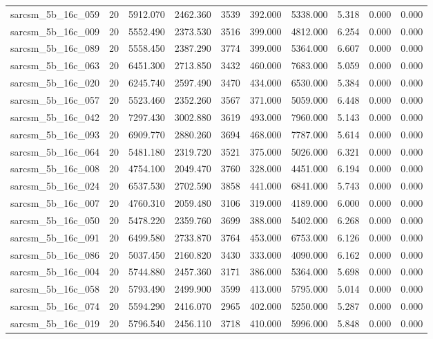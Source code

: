 \begin{tabular}{lrrrrrrrrr}
sarcsm\_5b\_16c\_059 & 20 & 5912.070 & 2462.360 & 3539 & 392.000 & 5338.000 & 5.318 & 0.000 & 0.000 \\
sarcsm\_5b\_16c\_009 & 20 & 5552.490 & 2373.530 & 3516 & 399.000 & 4812.000 & 6.254 & 0.000 & 0.000 \\
sarcsm\_5b\_16c\_089 & 20 & 5558.450 & 2387.290 & 3774 & 399.000 & 5364.000 & 6.607 & 0.000 & 0.000 \\
sarcsm\_5b\_16c\_063 & 20 & 6451.300 & 2713.850 & 3432 & 460.000 & 7683.000 & 5.059 & 0.000 & 0.000 \\
sarcsm\_5b\_16c\_020 & 20 & 6245.740 & 2597.490 & 3470 & 434.000 & 6530.000 & 5.384 & 0.000 & 0.000 \\
sarcsm\_5b\_16c\_057 & 20 & 5523.460 & 2352.260 & 3567 & 371.000 & 5059.000 & 6.448 & 0.000 & 0.000 \\
sarcsm\_5b\_16c\_042 & 20 & 7297.430 & 3002.880 & 3619 & 493.000 & 7960.000 & 5.143 & 0.000 & 0.000 \\
sarcsm\_5b\_16c\_093 & 20 & 6909.770 & 2880.260 & 3694 & 468.000 & 7787.000 & 5.614 & 0.000 & 0.000 \\
sarcsm\_5b\_16c\_064 & 20 & 5481.180 & 2319.720 & 3521 & 375.000 & 5026.000 & 6.321 & 0.000 & 0.000 \\
sarcsm\_5b\_16c\_008 & 20 & 4754.100 & 2049.470 & 3760 & 328.000 & 4451.000 & 6.194 & 0.000 & 0.000 \\
sarcsm\_5b\_16c\_024 & 20 & 6537.530 & 2702.590 & 3858 & 441.000 & 6841.000 & 5.743 & 0.000 & 0.000 \\
sarcsm\_5b\_16c\_007 & 20 & 4760.310 & 2059.480 & 3106 & 319.000 & 4189.000 & 6.000 & 0.000 & 0.000 \\
sarcsm\_5b\_16c\_050 & 20 & 5478.220 & 2359.760 & 3699 & 388.000 & 5402.000 & 6.268 & 0.000 & 0.000 \\
sarcsm\_5b\_16c\_091 & 20 & 6499.580 & 2733.870 & 3764 & 453.000 & 6753.000 & 6.126 & 0.000 & 0.000 \\
sarcsm\_5b\_16c\_086 & 20 & 5037.450 & 2160.820 & 3430 & 333.000 & 4090.000 & 6.162 & 0.000 & 0.000 \\
sarcsm\_5b\_16c\_004 & 20 & 5744.880 & 2457.360 & 3171 & 386.000 & 5364.000 & 5.698 & 0.000 & 0.000 \\
sarcsm\_5b\_16c\_058 & 20 & 5793.490 & 2499.900 & 3599 & 413.000 & 5795.000 & 5.014 & 0.000 & 0.000 \\
sarcsm\_5b\_16c\_074 & 20 & 5594.290 & 2416.070 & 2965 & 402.000 & 5250.000 & 5.287 & 0.000 & 0.000 \\
sarcsm\_5b\_16c\_019 & 20 & 5796.540 & 2456.110 & 3718 & 410.000 & 5996.000 & 5.848 & 0.000 & 0.000 \\

\end{tabular}
